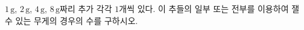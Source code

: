 \hspace*{2mm}\begin{minipage}[t]{\dimexpr\linewidth-2mm\relax}\vspace{0pt}
$1\,\mathrm{g}$, $2\,\mathrm{g}$, $4\,\mathrm{g}$, $8\,\mathrm{g}$짜리 추가 각각 $1$개씩 있다. 이 추들의 일부 또는 전부를 이용하여 잴 수 있는 무게의 경우의 수를 구하시오. \end{minipage}
